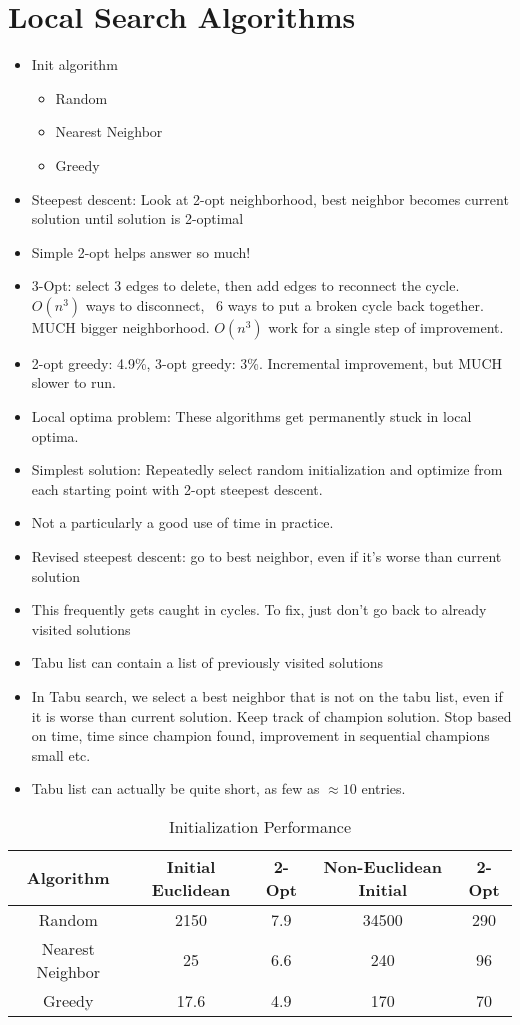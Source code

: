 \documentclass[12pt, letter]{article}
\begin{document}
\section{Local Search Algorithms}%
\begin{itemize}
	\item Init algorithm
	\begin{itemize}
		\item Random
		\item Nearest Neighbor
		\item Greedy
	\end{itemize}
	\item Steepest descent: Look at 2-opt neighborhood, best neighbor becomes current solution until solution is 2-optimal
	\item Simple 2-opt helps answer so much!
	\item 3-Opt: select 3 edges to delete, then add edges to reconnect the cycle. $O(n^{3})$ ways to disconnect, ~6 ways to put a broken cycle back together. MUCH bigger neighborhood. $O(n^{3})$ work for a single step of improvement.
	\item 2-opt greedy: 4.9\%, 3-opt greedy: 3\%. Incremental improvement, but MUCH slower to run.
	\item Local optima problem: These algorithms get permanently stuck in local optima.
	\item Simplest solution: Repeatedly select random initialization and optimize from each starting point with 2-opt steepest descent.
	\item Not a particularly a good use of time in practice.
	\item Revised steepest descent: go to best neighbor, even if it's worse than current solution
	\item This frequently gets caught in cycles. To fix, just don't go back to already visited solutions
	\item Tabu list can contain a list of previously visited solutions
	\item In Tabu search, we select a best neighbor that is not on the tabu list, even if it is worse than current solution. Keep track of champion solution. Stop based on time, time since champion found, improvement in sequential champions small etc.
	\item Tabu list can actually be quite short, as few as $\approx10$ entries.
\end{itemize}

\begin{table}[h]
	\centering
	\caption{Initialization Performance}
	\label{tab:label}
	\begin{tabular}{|c|c|c|c|c|}
	\hline
	Algorithm & Initial Euclidean & 2-Opt & Non-Euclidean Initial & 2-Opt\\
	\hline
	Random & 2150 & 7.9 & 34500 & 290\\
	\hline
	Nearest Neighbor & 25 & 6.6 & 240 & 96\\
	\hline
	Greedy & 17.6 & 4.9 & 170 & 70\\
	\hline
	\end{tabular}
\end{table}
\end{document}
